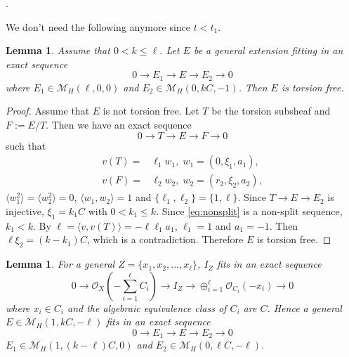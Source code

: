 \documentclass[10pt]{amsart}
\def\cal{\mathcal}
\newenvironment{NB}{
\color{red}{\bf NB}. \footnotesize 
}{}
\numberwithin{equation}{section}
\theoremstyle{plain}
\newtheorem{lem}[thm]{Lemma}
\theoremstyle{definition}
\theoremstyle{remark}
\begin{document}
\begin{NB}
We don't need the following anymore since $t<t_1$.
\begin{lem}
Assume that $0<k \leq \ell$.
Let $E$ be a general extension fitting in an exact sequence
\begin{equation}\label{eq:nonsplit}
0 \to E_1 \to E \to E_2 \to 0
\end{equation}
where $E_1 \in {\cal M}_H(\ell,0,0)$ and $E_2 \in {\cal M}_H(0,kC,-1)$.
Then $E$ is torsion free.
\end{lem}

\begin{proof}
Assume that $E$ is not torsion free. Let $T$ be the torsion subsheaf and
$F:=E/T$. Then we have an exact sequence
$$
0 \to T \to E \to F \to 0
$$
such that 
\begin{equation}
\begin{split}
v(T)= & \ell_1 w_1,\; w_1=(0,\xi_1,a_1),\\
v(F)=& \ell_2 w_2,\; w_2=(r_2,\xi_2,a_2),
\end{split}
\end{equation}
$\langle w_1^2 \rangle=\langle w_2^2 \rangle=0$, $\langle w_1,w_2 \rangle=1$ and $\{\ell_1,\ell_2\}=\{1,\ell\}$.
Since $T \to E \to E_2$ is injective,
$\xi_1=k_1 C$ with $0<k_1 \leq k$.
Since \eqref{eq:nonsplit} is a non-split sequence,
$k_1<k$.
By $\ell=\langle v,v(T) \rangle=-\ell \ell_1 a_1$, $\ell_1=1$ and $a_1=-1$.
Then $\ell \xi_2=(k-k_1)C$, which is a contradiction.
Therefore $E$ is torsion free.
\end{proof}

\begin{lem}
For a general $Z=\{ x_1,x_2,...,x_\ell \}$,
$I_Z$ fits in an exact sequence
$$
0 \to {\cal O}_X(-\sum_{i=1}^\ell C_i) \to I_Z \to \oplus_{i=1}^\ell {\cal O}_{C_i}(-x_i) \to 0
$$ 
where $x_i \in C_i$ and the algebraic equivalence class of $C_i$ are $C$.  
Hence a general $E \in {\cal M}_H(1,kC,-\ell)$ fits in an exact sequence 
\begin{equation}
0 \to E_1 \to E \to E_2 \to 0
\end{equation}
$E_1 \in {\cal M}_H(1,(k-\ell)C,0)$ and $E_2 \in {\cal M}_H(0,\ell C,-\ell)$.
\end{lem}

\end{NB}
\end{document}
